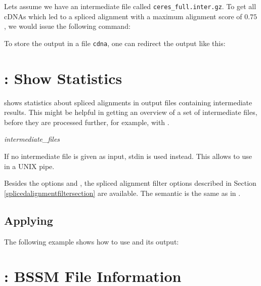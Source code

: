 \documentclass[11pt,a4paper,titlepage]{article}
\begin{document}
Lets assume we have an intermediate file called \texttt{ceres\_full.inter.gz}.
To get all cDNAs which led to a spliced alignment with a maximum alignment score of $0.75$, we would issue the following command:

\begin{footnotesize}\end{footnotesize}

To store the output in a file \texttt{cdna}, one can redirect the output like this:

\begin{scriptsize}\end{scriptsize}

\section{\Callgthfilestat: Show Statistics}
\label{gthfilestatsection}
\Callgthfilestat shows statistics about spliced alignments in \Gth output files containing intermediate results.
This might be helpful in getting an overview of a set of intermediate files, before they are processed further, for example, with \Callgthsplit.

\medskip
{} \textit{intermediate\_files}
\medskip

If no intermediate file is given as input, stdin is used instead. This allows
to use \Callgthfilestat in a UNIX pipe.

Besides the options  and , the spliced alignment filter options described in Section \ref{splicedalignmentfiltersection}
are available. The semantic is the same as in \Callgth.

\subsection{Applying \Callgthfilestat}

The following example shows how to use \Callgthfilestat and its output:

\begin{footnotesize}\end{footnotesize}

\section{\Callgthbssmfileinfo: BSSM File Information}
\label{gthbssmfileinfosection}
\end{document}
